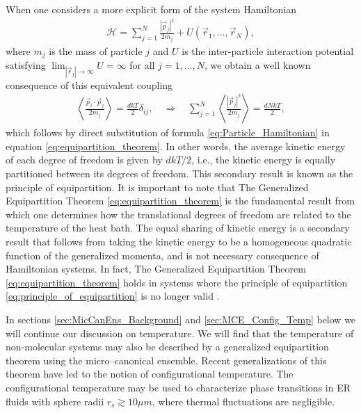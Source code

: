 \documentclass[english,12pt]{ttuthes}
\newcommand{\Hc}{\mathcal{H}}
\begin{document}
When one considers a more explicit form of the system Hamiltonian
%
\begin{align}\label{eq:Particle_Hamiltonian}
  \Hc=\sum_{j=1}^N\frac{|\vec{p}_j|^2}{2m_j}+U(\vec{r}_1,\ldots,\vec{r}_N),
\end{align}
%
where $m_j$ is the mass of particle $j$ and $U$ is the inter-particle
interaction potential satisfying $\lim_{|\vec{r}_j|\to\infty}U=\infty$ for all
$j=1,\ldots,N$, we obtain a well known consequence of this equivalent
coupling \cite{Uline:JCP:124301}   
%
\begin{align}\label{eq:principle_of_equipartition}
  \left\langle\frac{\vec{p}_i\cdot\vec{p}_j}{2m_j}\right\rangle=\frac{dkT}{2}\delta_{ij},
  \quad \Rightarrow \quad
  \sum_{j=1}^N\left\langle\frac{|\vec{p}_j|^2}{2m_j}\right\rangle=\frac{dNkT}{2},
\end{align}
%
which follows by direct substitution of formula
\eqref{eq:Particle_Hamiltonian} in equation
\eqref{eq:equipartition_theorem}. In other words, the average kinetic
energy of each degree of freedom is given by $dkT/2$, i.e., the
kinetic energy is equally partitioned between its degrees of
freedom. This secondary result is known as the principle of
equipartition. It is important to note that The Generalized Equipartition
Theorem \eqref{eq:equipartition_theorem} is the fundamental result
from which one determines how the translational degrees of freedom are
related to the temperature of the heat bath. The equal sharing of
kinetic energy is a secondary result that follows from taking the
kinetic energy to be a homogeneous quadratic function of the
generalized momenta, and is not necessary consequence of Hamiltonian
systems. In fact, The Generalized Equipartition Theorem
\eqref{eq:equipartition_theorem} holds in systems where the principle
of equipartition \eqref{eq:principle_of_equipartition} is no longer
valid \cite{Uline:JCP:124301}.

In sections \ref{sec:MicCanEns_Background} and
\ref{sec:MCE_Config_Temp} below we will continue our discussion on
temperature. We will find that the temperature of non-molecular
systems may also be described by a generalized equipartition theorem
using the micro--canonical ensemble. Recent generalizations of this
theorem have led to the notion of configurational temperature. The
configurational temperature may be used to characterize phase
transitions in ER fluids with sphere radii $r_s\gtrsim10\mu m$, where thermal
fluctuations are negligible.
%
\end{document}
